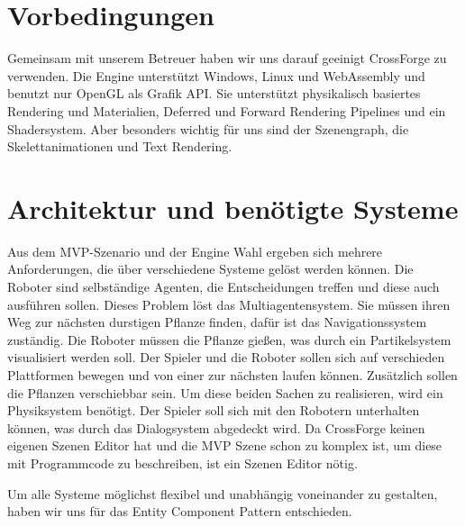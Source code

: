 
\section{Vorbedingungen}

Gemeinsam mit unserem Betreuer haben wir uns darauf geeinigt CrossForge zu verwenden. Die Engine unterstützt Windows, Linux und WebAssembly und benutzt nur OpenGL als Grafik API. Sie unterstützt physikalisch basiertes Rendering und Materialien, Deferred und Forward Rendering Pipelines und ein Shadersystem. Aber besonders wichtig für uns sind der Szenengraph, die Skelettanimationen und Text Rendering.

\section{Architektur und benötigte Systeme}

Aus dem MVP-Szenario und der Engine Wahl ergeben sich mehrere Anforderungen, die über verschiedene Systeme gelöst werden können. Die Roboter sind selbständige Agenten, die Entscheidungen treffen und diese auch ausführen sollen. Dieses Problem löst das Multiagentensystem. Sie müssen ihren Weg zur nächsten durstigen Pflanze finden, dafür ist das Navigationssystem zuständig. Die Roboter müssen die Pflanze gießen, was durch ein Partikelsystem visualisiert werden soll. Der Spieler und die Roboter sollen sich auf verschieden Plattformen bewegen und von einer zur nächsten laufen können. Zusätzlich sollen die Pflanzen verschiebbar sein. Um diese beiden Sachen zu realisieren, wird ein Physiksystem benötigt.
Der Spieler soll sich mit den Robotern unterhalten können, was durch das Dialogsystem abgedeckt wird.
Da CrossForge keinen eigenen Szenen Editor hat und die MVP Szene schon zu komplex ist, um diese mit Programmcode zu beschreiben, ist ein Szenen Editor nötig.

Um alle Systeme möglichst flexibel und unabhängig voneinander zu gestalten, haben wir uns für das Entity Component Pattern entschieden.

